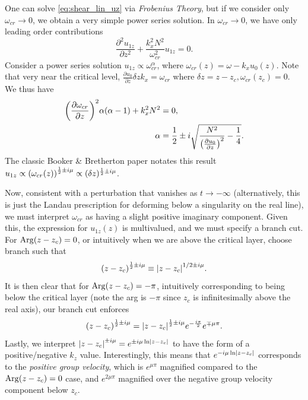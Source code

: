 \documentclass[11pt,
        usenames, %
        dvipsnames %
    ]{report}
\newcommand*{\pd}[2]{\frac{\partial#1}{\partial#2}}
\newcommand*{\ptd}[2]{\frac{\partial^2 #1}{\partial#2^2}}
\DeclareMathOperator{\Arg}{Arg}
\DeclarePairedDelimiter\abs{\lvert}{\rvert}
\DeclarePairedDelimiter\p{\lparen}{\rparen}
\begin{document}
One can solve \autoref{eq:shear_lin_uz} via \emph{Frobenius Theory}, but if we
consider only $\omega_{cr} \to 0$, we obtain a very simple power series
solution. In $\omega_{cr} \to 0$, we have only leading order contributions
\begin{equation}
    \ptd{u_{1z}}{z} + \frac{k_x^2N^2}{\omega_{cr}^2}u_{1z} = 0.
\end{equation}
Consider a power series solution $u_{1z} \propto \omega_{cr}^\alpha$, where
$\omega_{cr}(z) = \omega - k_xu_0(z)$. Note that very near the critical level,
$\pd{u_0}{z}\delta z k_x = \omega_{cr}$ where $\delta z = z - z_c,
\omega_{cr}(z_c) = 0$. We thus have
\begin{align}
    \p*{\pd{\omega_{cr}}{z}}^2 \alpha\p*{\alpha - 1} + k_x^2N^2 &= 0,\\
    \alpha &= \frac{1}{2}\pm i\sqrt{\frac{N^2}{\p*{\pd{u_0}{z}}^2} -
        \frac{1}{4}}.
\end{align}
The classic Booker \& Bretherton paper notates this result $u_{1z} \propto
\p*{\omega_{cr}(z)}^{\frac{1}{2} \pm i\mu} \propto (\delta z)^{\frac{1}{2} \pm
i\mu}$.

Now, consistent with a perturbation that vanishes as $t \to -\infty$
(alternatively, this is just the Landau prescription for deforming below a
singularity on the real line), we must interpret $\omega_{cr}$ as having a
slight positive imaginary component. Given this, the expression for $u_{1z}(z)$
is multivalued, and we must specify a branch cut. For $\Arg\p*{z - z_c} = 0$, or
intuitively when we are above the critical layer, choose branch such that
\begin{equation}
    \p*{z - z_c}^{\frac{1}{2} \pm i\mu} \equiv
        \abs*{z - z_c}^{1/2\pm i\mu}.
\end{equation}
It is then clear that for $\Arg\p*{z - z_c} = -\pi$, intuitively corresponding
to being below the critical layer (note the arg is $-\pi$ since $z_c$ is
infinitesimally above the real axis), our branch cut enforces
\begin{equation}
    \p*{z - z_c}^{\frac{1}{2} \pm i\mu} =
        \abs*{z - z_c}^{\frac{1}{2} \pm i\mu}e^{-\frac{i\pi}{2}}e^{\mp \mu \pi}.
\end{equation}
Lastly, we interpret $\abs*{z - z_c}^{\pm i\mu} = e^{\pm i\mu \ln \abs*{z -
z_c}}$ to have the form of a positive/negative $k_z$ value. Interestingly, this
means that $e^{-i\mu \ln \abs*{z - z_c}}$ corresponds to the \emph{positive
group velocity}, which is $e^{\mu \pi}$ magnified compared to the $\Arg\p*{z -
z_c} = 0$ case, and $e^{2\mu \pi}$ magnified over the negative group velocity
component below $z_c$.
\end{document}
